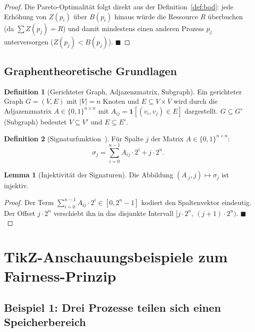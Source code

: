 ﻿\documentclass[a4paper,12pt]{article}
\theoremstyle{definition}
\newtheorem{definition}{Definition}
\newtheorem{lemma}{Lemma}
\begin{document}
\begin{proof}
Die Pareto-Optimalität folgt direkt aus der Definition~\ref{def:bod}:
jede Erhöhung von $Z(p_i)$ über $B(p_i)$ hinaus würde die Ressource
$R$ überbuchen (da $\sum Z(p_j) = R$) und damit mindestens einen
anderen Prozess $p_j$ unterversorgen ($Z(p_j) < B(p_j)$).
\hfill$\blacksquare$
\end{proof}

\subsection{Graphentheoretische Grundlagen}

\begin{definition}[Gerichteter Graph, Adjazenzmatrix, Subgraph]
Ein gerichteter Graph $G = (V, E)$ mit $|V| = n$ Knoten und
$E \subseteq V \times V$ wird durch die Adjazenzmatrix
$A \in \{0,1\}^{n\times n}$ mit $A_{ij} = \mathbf{1}[(v_i, v_j) \in E]$
dargestellt. $G \subseteq G'$ (Subgraph) bedeutet $V \subseteq V'$ und
$E \subseteq E'$.
\end{definition}

\begin{definition}[Signaturfunktion~\cite{epp2026subgraph}]
\label{def:sig}
Für Spalte $j$ der Matrix $A \in \{0,1\}^{n\times n}$:
\[
  \sigma_j = \sum_{i=0}^{n-1} A_{ij} \cdot 2^i + j \cdot 2^n.
\]
\end{definition}

\begin{lemma}[Injektivität der Signaturen]
Die Abbildung $(A_{\cdot j}, j) \mapsto \sigma_j$ ist injektiv.
\end{lemma}

\begin{proof}
Der Term $\sum_{i=0}^{n-1} A_{ij} \cdot 2^i \in [0, 2^n - 1]$ kodiert
den Spaltenvektor eindeutig. Der Offset $j \cdot 2^n$ verschiebt ihn
in das disjunkte Intervall $[j \cdot 2^n,\, (j+1) \cdot 2^n)$.
\hfill$\blacksquare$
\end{proof}

\section{TikZ-Anschauungsbeispiele zum Fairness-Prinzip}
\label{sec:tikz}

\subsection{Beispiel 1: Drei Prozesse teilen sich einen Speicherbereich}
\end{document}
